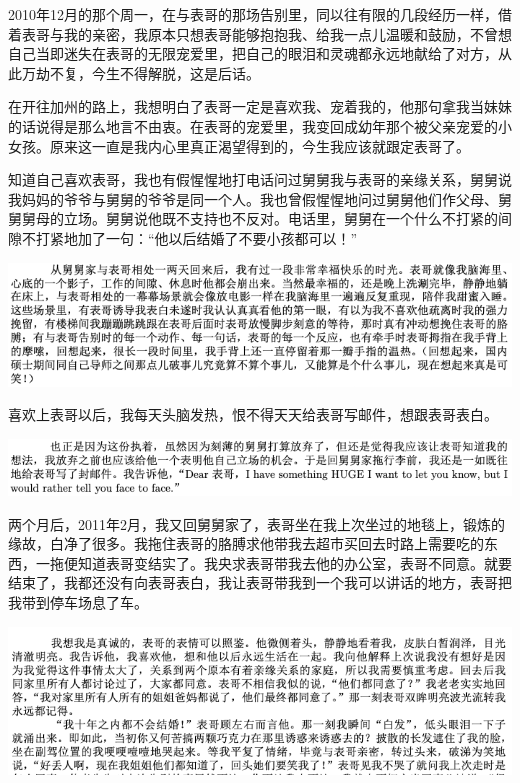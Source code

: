 \documentclass[9pt, b5paper]{article}
\begin{document}
2010年12月的那个周一，在与表哥的那场告别里，同以往有限的几段经历一样，借着表哥与我的亲密，我原本只想表哥能够抱抱我、给我一点儿温暖和鼓励，不曾想自己当即迷失在表哥的无限宠爱里，把自己的眼泪和灵魂都永远地献给了对方，从此万劫不复，今生不得解脱，这是后话。 

在开往加州的路上，我想明白了表哥一定是喜欢我、宠着我的，他那句拿我当妹妹的话说得是那么地言不由衷。在表哥的宠爱里，我变回成幼年那个被父亲宠爱的小女孩。原来这一直是我内心里真正渴望得到的，今生我应该就跟定表哥了。 

知道自己喜欢表哥，我也有假惺惺地打电话问过舅舅我与表哥的亲缘关系，舅舅说我妈妈的爷爷与舅舅的爷爷是同一个人。我也曾假惺惺地问过舅舅他们作父母、舅舅舅母的立场。舅舅说他既不支持也不反对。电话里，舅舅在一个什么不打紧的间隙不打紧地加了一句：“他以后结婚了不要小孩都可以！”

\begin{center}
\includegraphics[width=.9\linewidth]{./pic/p1p45.png}
\end{center}

喜欢上表哥以后，我每天头脑发热，恨不得天天给表哥写邮件，想跟表哥表白。

\begin{center}
\includegraphics[width=.9\linewidth]{./pic/p1p49.png}
\end{center}

两个月后，2011年2月，我又回舅舅家了，表哥坐在我上次坐过的地毯上，锻炼的缘故，白净了很多。我拖住表哥的胳膊求他带我去超市买回去时路上需要吃的东西，一拖便知道表哥变结实了。我央求表哥带我去他的办公室，表哥不同意。就要结束了，我都还没有向表哥表白，我让表哥带我到一个我可以讲话的地方，表哥把我带到停车场息了车。

\begin{center}
\includegraphics[width=.9\linewidth]{./pic/p1p50.png}
\end{center}
\end{document}
